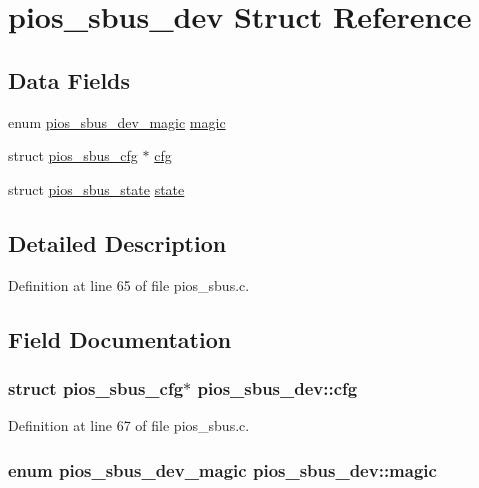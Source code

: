 \hypertarget{structpios__sbus__dev}{\section{pios\-\_\-sbus\-\_\-dev Struct Reference}
\label{structpios__sbus__dev}
}
\subsection*{Data Fields}
\begin{DoxyCompactItemize}
\item 
enum \hyperlink{group___p_i_o_s___s_bus_ga595ee1f903af9c4166426f9cc144b36c}{pios\-\_\-sbus\-\_\-dev\-\_\-magic} \hyperlink{structpios__sbus__dev_a7cc93108060c6f0d89153b5fff91e8a3}{magic}
\item 
struct \hyperlink{structpios__sbus__cfg}{pios\-\_\-sbus\-\_\-cfg} $\ast$ \hyperlink{structpios__sbus__dev_a6849c60224852efbaed85e91a3008d62}{cfg}
\item 
struct \hyperlink{structpios__sbus__state}{pios\-\_\-sbus\-\_\-state} \hyperlink{structpios__sbus__dev_aeddc0c60e673c21f9c666cc8134935ee}{state}
\end{DoxyCompactItemize}


\subsection{Detailed Description}


Definition at line 65 of file pios\-\_\-sbus.\-c.



\subsection{Field Documentation}
\hypertarget{structpios__sbus__dev_a6849c60224852efbaed85e91a3008d62}{
\subsubsection[{cfg}]{\setlength{\rightskip}{0pt plus 5cm}struct {\bf pios\-\_\-sbus\-\_\-cfg}$\ast$ pios\-\_\-sbus\-\_\-dev\-::cfg}}\label{structpios__sbus__dev_a6849c60224852efbaed85e91a3008d62}


Definition at line 67 of file pios\-\_\-sbus.\-c.

\hypertarget{structpios__sbus__dev_a7cc93108060c6f0d89153b5fff91e8a3}{
\subsubsection[{magic}]{\setlength{\rightskip}{0pt plus 5cm}enum {\bf pios\-\_\-sbus\-\_\-dev\-\_\-magic} pios\-\_\-sbus\-\_\-dev\-::magic}}\label{structpios__sbus__dev_a7cc93108060c6f0d89153b5fff91e8a3}


